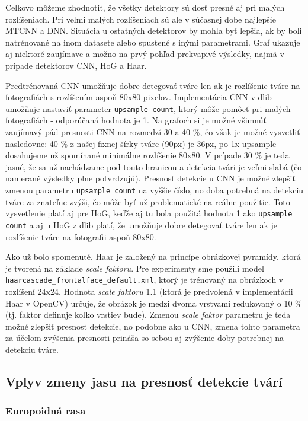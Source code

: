 \documentclass[]{article}
\begin{document}
	Celkovo môžeme zhodnotiť, že všetky detektory sú dosť presné aj pri malých rozlíšeniach. Pri veľmi malých rozlíšeniach sú ale v súčasnej dobe najlepšie MTCNN a DNN.
	Situácia u ostatných detektorov by mohla byť lepšia, ak by boli natrénované na inom datasete alebo spustené s inými parametrami. Graf ukazuje aj niektoré zaujímave a možno na prvý pohľad prekvapivé výsledky, najmä v prípade detektorov CNN, HoG a Haar. 
	
	Predtrénovaná CNN umožňuje dobre detegovať tváre len ak je rozlíšenie tváre na fotografiách s rozlíšením aspoň 80x80 pixelov. Implementácia CNN v dlib umožňuje nastaviť parameter \texttt{upsample count}, ktorý môže pomôcť pri malých fotografiách \-- odporúčaná hodnota je 1. Na grafoch si je možné všimnúť zaujímavý pád presnosti CNN na rozmedzí 30 a 40 \%, čo však je možné vysvetliť nasledovne: 40 \% z našej fixnej šírky tváre (90px) je 36px, po 1x upsample dosahujeme už spomínané minimálne rozlíšenie 80x80. V prípade 30 \% je teda jasné, že sa už nachádzame pod touto hranicou a detekcia tvári je veľmi slabá (čo namerané výsledky plne potvrdzujú). Presnosť detekcie u CNN je možné zlepšiť zmenou parametru \texttt{upsample count} na vyššie číslo, no doba potrebná na detekciu tváre za znateľne zvýši, čo môže byť už problematické na reálne použitie. Toto vysvetlenie platí aj pre HoG, keďže aj tu bola použitá hodnota 1 ako \texttt{upsample count} a aj u HoG z dlib platí, že umožňuje dobre detegovať tváre len ak je rozlíšenie tváre na fotografii aspoň 80x80.

	Ako už bolo spomenuté, Haar je založený na princípe obrázkovej pyramídy, ktorá je tvorená na základe \textit{scale faktoru}. Pre experimenty sme použili model \texttt{haarcascade\_frontalface\_default.xml}, ktorý je trénovaný na obrázkoch v rozlíšení 24x24. Hodnota \textit{scale faktoru} 1.1 (ktorá je predvolená v implementácii Haar v OpenCV) určuje, že obrázok je medzi dvoma vrstvami redukovaný o 10 \% (tj. faktor definuje koľko vrstiev bude). Zmenou \textit{scale faktor} parametru je teda možné zlepšiť presnosť detekcie, no podobne ako u CNN, zmena tohto parametra za účelom zvýšenia presnosti prináša so sebou aj zvýšenie doby potrebnej na detekciu tváre. 
	
	\newpage
	\subsection*{Vplyv zmeny jasu na presnosť detekcie tvárí}
	
	\subsubsection*{Europoidná rasa}
	
\end{document}

